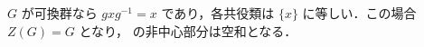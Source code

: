 \begin{prop}[可換群の類等式]
$G$ が可換群なら $gxg^{-1}=x$ であり，各共役類は $\{x\}$ に等しい．この場合 $Z(G)=G$ となり， の非中心部分は空和となる．
\end{prop}

